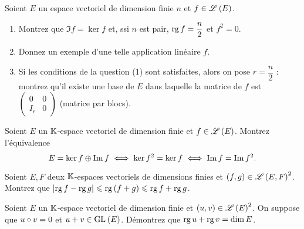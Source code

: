 \begin{exopss}[Exercice 16]
Soient \(E\) un espace vectoriel de dimension finie \(n\) et \(f\in\mathscr{L}\left(E\right)\).

\begin{enumerate}
    \item Montrez que \(\Im f=\ker f\) et, ssi \(n\) est pair, \(\operatorname{rg} f=\dfrac{n}{2}\) et \(f^2=0\). \\
    \item Donnez un exemple d'une telle application linéaire \(f\). \\
    \item Si les conditions de la question (1)  sont satisfaites, alors on pose \(r=\dfrac{n}{2}\) : montrez qu'il existe une base de \(E\) dans laquelle la matrice de \(f\) est \(\begin{pmatrix}0 & 0 \\ I_r & 0\end{pmatrix}\) (matrice par blocs).
\end{enumerate}
\end{exopss}



\begin{exopss}[Exercice 17]
Soient \(E\) un \(\mathbb{K}\)-espace vectoriel de dimension finie et \(f\in\mathscr{L}\left(E\right)\). Montrez l'équivalence \[E=\ker f\oplus\operatorname{Im} f\iff\ker f^2=\ker f\iff\operatorname{Im} f=\operatorname{Im} f^2.\]
\end{exopss}



\begin{exos}[Exercice 18]
Soient \(E,F\) deux \(\mathbb{K}\)-espaces vectoriels de dimensions finies et \(\left(f,g\right)\in\mathscr{L}\left(E,F\right)^2\). Montrez que \(\left\lvert\operatorname{rg} f-\operatorname{rg} g\right\rvert\leqslant\operatorname{rg}\left(f+g\right)\leqslant\operatorname{rg} f+\operatorname{rg} g\).
\end{exos}



\begin{exoss}[Exercice 19]
Soient \(E\) un \(\mathbb{K}\)-espace vectoriel de dimension finie et \(\left(u,v\right)\in\mathscr{L}\left(E\right)^2\). On suppose que \(u\circ v=0\) et \(u+v\in\GL{}[E]\). Démontrez que \(\operatorname{rg} u+\operatorname{rg} v=\dim E\).
\end{exoss}



